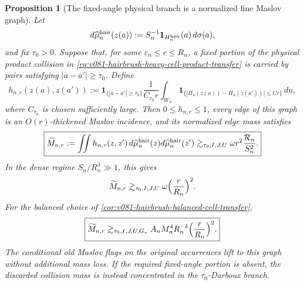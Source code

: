 \documentclass[10pt]{article}
\newtheorem{proposition}[theorem]{Proposition}
\begin{document}
\begin{proposition}[The fixed-angle physical branch is a normalized fine Maslov graph]
\label{prop:v081-hairbrush-fine-maslov-graph}
Let
\[
d\widehat\mu_n^{\rm hair}(z(a))
:=
S_n^{-1}\mathbf 1_{H_n^{\rm hair}}(a)\,d\sigma(a),
\]
and fix \(\tau_0>0\).  Suppose that, for some
\(\varepsilon_n\le r\le R_n\), a fixed portion of the physical product collision in
\eqref{eq:v081-hairbrush-heavy-cell-product-transfer} is carried by pairs satisfying
\(|a-a'|\ge\tau_0\).  Define
\begin{equation}
\label{eq:v081-hairbrush-fine-maslov-kernel}
h_{n,r}(z(a),z(a'))
:=
\mathbf 1_{\{|a-a'|\ge\tau_0\}}
\frac{1}{C_{\tau_0}r}
\int_{W_n}
\mathbf 1_{\{|\Pi_u(z(a))-\Pi_u(z(a'))|\le C r\}}\,du,
\end{equation}
where \(C_{\tau_0}\) is chosen sufficiently large.  Then
\(0\le h_{n,r}\le1\), every edge of this graph is an \(O(r)\)-thickened Maslov
incidence, and its normalized edge mass satisfies
\begin{equation}
\label{eq:v081-hairbrush-fine-maslov-edge-mass}
\boxed{
\widetilde M_{n,r}
:=
\iint h_{n,r}(z,z')\,
d\widehat\mu_n^{\rm hair}(z)d\widehat\mu_n^{\rm hair}(z')
\gtrsim_{\tau_0,I,J,U}
\omega r^2\frac{\mathcal R_n}{S_n^2}.
}
\end{equation}
In the dense regime \(S_n/R_n^3\gg1\), this gives
\begin{equation}
\label{eq:v081-hairbrush-fine-maslov-edge-scale}
\widetilde M_{n,r}
\gtrsim_{\tau_0,I,J,U}
\omega\Bigl(\frac r{R_n}\Bigr)^2.
\end{equation}
For the balanced choice of
\cref{cor:v081-hairbrush-balanced-cell-transfer},
\begin{equation}
\label{eq:v081-hairbrush-balanced-fine-maslov-edge}
\boxed{
\widetilde M_{n,r}
\gtrsim_{\tau_0,I,J,U,G_*}
A_nM_n^4R_n^{-\delta}
\Bigl(\frac r{R_n}\Bigr)^2.
}
\end{equation}
The conditional old Maslov flags on the original occurrences lift to this graph without
additional mass loss.  If the required fixed-angle portion is absent, the discarded collision
mass is instead concentrated in the \(\tau_0\)-Darboux branch.
\end{proposition}
\end{document}
